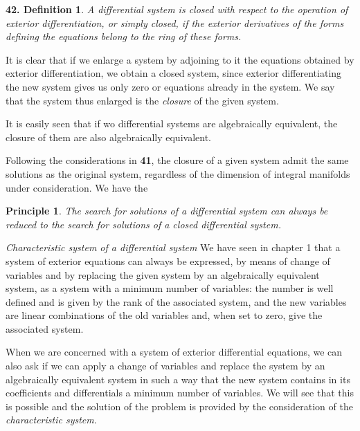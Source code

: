 \vspace{12pt}\addtocounter{frenchsec}{1}
\theoremstyle{shape1}
\newtheorem*{dfn42}{\hspace{15pt}\textbf{42.} Definition}
\begin{dfn42}
  A differential system is closed with respect to the operation of exterior differentiation, or simply closed, if the exterior derivatives of the forms defining the equations belong to the ring of these forms.
\end{dfn42}

It is clear that if we enlarge a system by adjoining to it the equations obtained by exterior differentiation, we obtain a closed system, since exterior differentiating the new system gives us only zero or equations already in the system. We say that the system thus enlarged is the \emph{closure} of the given system.

It is easily seen that if wo differential systems are algebraically equivalent, the closure of them are also algebraically equivalent.

Following the considerations in \textsection\textbf{41},  the  closure of a given system admit the same solutions as the original system, regardless of the dimension of integral manifolds under consideration. We have the
\newtheorem*{prin*}{\hspace{15pt}Principle}
\begin{prin*}
  The search for  solutions of a differential system can always be reduced to the search for  solutions of a closed differential system.
\end{prin*}

\vspace{12pt}\fsec\emph{Characteristic system of a differential system} We have seen in chapter 1 that a system of exterior equations can always be expressed, by means of change of variables and by replacing the given system by an algebraically equivalent system, as a system with a minimum number of variables: the number is well defined and is given by the rank of the associated system, and the new variables are linear combinations of the old variables and, when set to zero, give the associated system.

When we are concerned with a system of exterior differential equations, we can also ask if we can apply a change of variables and replace the system by an algebraically equivalent system in such a way that the new system contains in its coefficients and differentials a minimum number of variables. We will see that this is possible and the solution of the problem is provided by the consideration of the \emph{characteristic system}.

